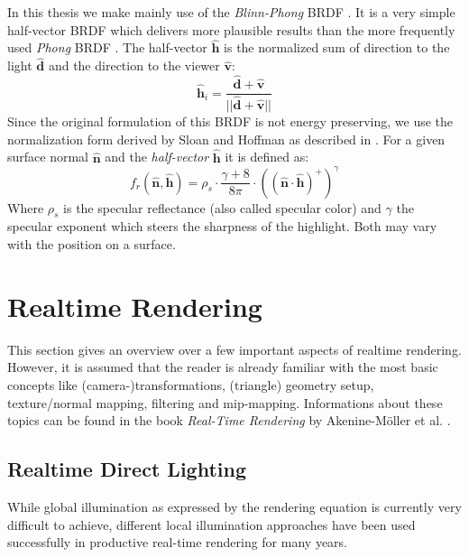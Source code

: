 \documentclass[thesis.tex]{subfiles}
\begin{document}
In this thesis we make mainly use of the \emph{Blinn-Phong} BRDF \cite{bib:blinnphongbrdf}.
It is a very simple half-vector BRDF which delivers more plausible results than the more frequently used \emph{Phong} BRDF \cite[p.~251f]{bib:RealtimeRenderingBook}.
The half-vector $\hat{\mathbf{h}}$ is the normalized sum of direction to the light $\hat{\mathbf{d}}$ and the direction to the viewer $\hat{\mathbf{v}}$:
\begin{equation}
\hat{\mathbf{h}}_i = \frac{\hat{\mathbf{d}} + \hat{\mathbf{v}}}{||\hat{\mathbf{d}} + \hat{\mathbf{v}}||}
\end{equation}
Since the original formulation of this BRDF is not energy preserving, we use the normalization form derived by Sloan and Hoffman as described in \cite[p.~257]{bib:RealtimeRenderingBook}.
For a given surface normal $\hat{\mathbf{n}}$ and the \emph{half-vector} $\hat{\mathbf{h}}$ it is defined as:
\begin{equation}
f_r(\hat{\mathbf{n}}, \hat{\mathbf{h}}) = \rho_s \cdot \frac{\gamma + 8}{8\pi} \cdot ((\hat{\mathbf{n}} \cdot \hat{\mathbf{h}})^+)^\gamma
\end{equation}
Where $\rho_s$ is the specular reflectance (also called specular color) and $\gamma$ the specular exponent which steers the sharpness of the highlight.
Both may vary with the position on a surface.

\section{Realtime Rendering}
This section gives an overview over a few important aspects of realtime rendering.
However, it is assumed that the reader is already familiar with the most basic concepts like (camera-)transformations, (triangle) geometry setup, texture/normal mapping, filtering and mip-mapping.
Informations about these topics can be found in the book \emph{Real-Time Rendering} by Akenine-M\"{o}ller et al. \cite{bib:RealtimeRenderingBook}. %

\subsection{Realtime Direct Lighting}
While global illumination as expressed by the rendering equation is currently very difficult to achieve, different local illumination approaches have been used successfully in productive real-time rendering for many years.
\end{document}
